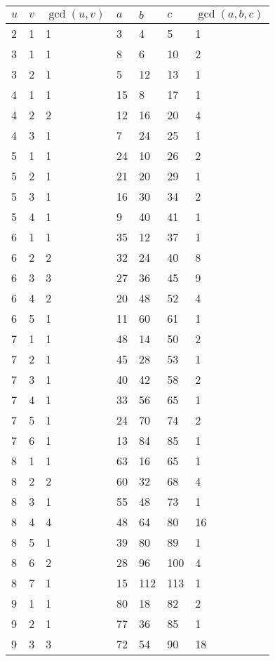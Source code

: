 \documentclass[letterpaper, 12pt, oneside]{memoir}
\theoremstyle{mystyle}
\begin{document}
\begin{table}[h!]
    \tiny
    \centering
\begin{tabular}{|l l l|l l l l|}
    \hline
    $u$ & $v$ & $\gcd (u, v)$  & $a$   & $b$   & $c$ & $\gcd(a,b,c)$  \\
    \hline
    2 & 1 & 1 & 3 & 4 & 5 & 1 \\
    3 & 1 & 1 & 8 & 6 & 10 & 2 \\
    3 & 2 & 1 & 5 & 12 & 13 & 1 \\
    4 & 1 & 1 & 15 & 8 & 17 & 1 \\
    4 & 2 & 2 & 12 & 16 & 20 & 4 \\
    4 & 3 & 1 & 7 & 24 & 25 & 1 \\
    5 & 1 & 1 & 24 & 10 & 26 & 2 \\
    5 & 2 & 1 & 21 & 20 & 29 & 1 \\
    5 & 3 & 1 & 16 & 30 & 34 & 2 \\
    5 & 4 & 1 & 9 & 40 & 41 & 1 \\
    6 & 1 & 1 & 35 & 12 & 37 & 1 \\
    6 & 2 & 2 & 32 & 24 & 40 & 8 \\
    6 & 3 & 3 & 27 & 36 & 45 & 9 \\
    6 & 4 & 2 & 20 & 48 & 52 & 4 \\
    6 & 5 & 1 & 11 & 60 & 61 & 1 \\
    7 & 1 & 1 & 48 & 14 & 50 & 2 \\
    7 & 2 & 1 & 45 & 28 & 53 & 1 \\
    7 & 3 & 1 & 40 & 42 & 58 & 2 \\
    7 & 4 & 1 & 33 & 56 & 65 & 1 \\
    7 & 5 & 1 & 24 & 70 & 74 & 2 \\
    7 & 6 & 1 & 13 & 84 & 85 & 1 \\
    8 & 1 & 1 & 63 & 16 & 65 & 1 \\
    8 & 2 & 2 & 60 & 32 & 68 & 4 \\
    8 & 3 & 1 & 55 & 48 & 73 & 1 \\
    8 & 4 & 4 & 48 & 64 & 80 & 16 \\
    8 & 5 & 1 & 39 & 80 & 89 & 1 \\
    8 & 6 & 2 & 28 & 96 & 100 & 4 \\
    8 & 7 & 1 & 15 & 112 & 113 & 1 \\
    9 & 1 & 1 & 80 & 18 & 82 & 2 \\
    9 & 2 & 1 & 77 & 36 & 85 & 1 \\
    9 & 3 & 3 & 72 & 54 & 90 & 18 \\

\end{tabular}
\end{table}
\end{document}
